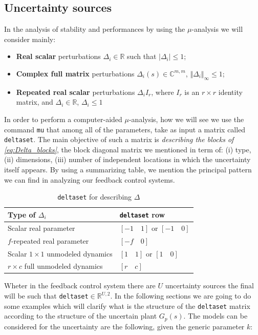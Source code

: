 \documentclass[a4paper, 12pt]{article}
\begin{document}
\subsection{Uncertainty sources}
In the analysis of stability and performances by using the $\mu$-analysis we will consider mainly:
\begin{itemize}
    \itemsep-0.2em
    \item \textbf{Real scalar} perturbations $\Delta_i\in\mathbb{R}$ such that $\vert \Delta_i \vert\le1$; 
    \item \textbf{Complex full matrix} perturbations $\Delta_i(s)\in\mathbb{C}^{m,m}$, $\Vert \Delta_i \Vert_\infty\le1$;
    \item \textbf{Repeated real scalar} perturbations $\Delta_i I_r$, where $I_r$ is an $r\times{r}$ identity matrix, and $\Delta_i\in\mathbb{R}$, $\Delta_i\le{1}$ 
\end{itemize}
In order to perform a computer-aided $\mu$-analysis, how we will see we use the command \texttt{mu} that among all of the parameters, take as input a matrix called \texttt{deltaset}. The main objective of such a matrix is \textit{describing the blocks of \ref{eq:Delta_blocks}}, the block diagonal matrix we mentioned in term of: (i) type, (ii) dimensions, (iii) number of independent locations in which the uncertainty itself appears. By using a summarizing table, we mention the principal pattern we can find in analyzing our feedback control systems. 

\begin{table}[h!]
    \centering
    \begin{tabular}{p{7cm} p{5cm}}
        \toprule[1pt]
        \textbf{Type of $\Delta_i$}&\textbf{\texttt{deltaset} row}\\
        \midrule
        Scalar real parameter&$[-1\quad{1}]$ or $[-1\quad0]$\\
        \midrule
        $f$-repeated real parameter&$[-f\quad{0}]$\\
        \midrule
        Scalar $1\times1$ unmodeled dynamics&$[1\quad{1}]$ or $[1\quad0]$\\
        \midrule
        $r\times{c}$ full unmodeled dynamics&$[r\quad{c}]$\\        \bottomrule[1pt]
    \end{tabular}
    \caption{\texttt{deltaset} for describing $\Delta$}
    \label{tab:deltaset}
\end{table}
\noindent
Wheter in the feedback control system there are $U$ uncertainty sources the final will be such that \texttt{deltaset}$\in\mathbb{R}^{U,2}$.
In the following sections we are going to do some examples which will clarify what is the structure of the \texttt{deltaset} matrix according to the structure of the uncertain plant $G_p(s)$.
The models can be considered for the uncertainty are the following, given the generic parameter $k$: 
\end{document}
